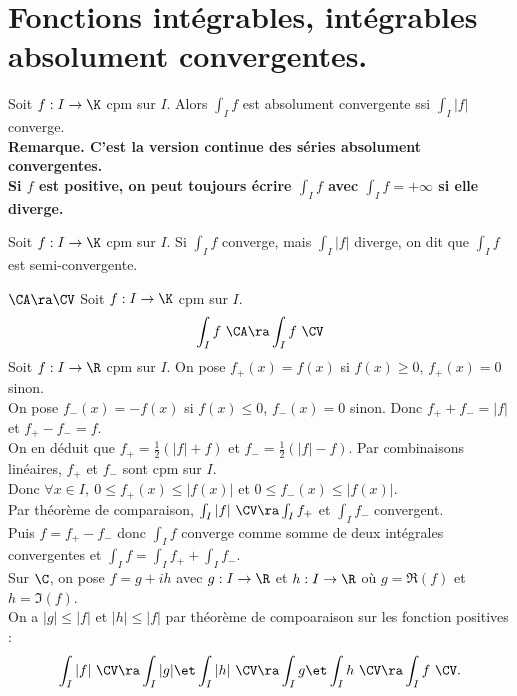 \documentclass[11pt]{article}
\begin{document}
\section{Fonctions intégrables, intégrables absolument convergentes.}

\begin{defi}{}{}
    Soit $f:I\to\K$ cpm sur $I$. Alors $\int_I f$ est absolument convergente ssi $\int_I|f|$ converge.\\
    \bf{Remarque.} C'est la version continue des séries absolument convergentes.\\
    Si $f$ est positive, on peut toujours écrire $\int_I f$ avec $\int_I f=+\infty$ si elle diverge.
\end{defi}

\begin{defi}{}{}
    Soit $f:I\to\K$ cpm sur $I$. Si $\int_I f$ converge, mais $\int_I|f|$ diverge, on dit que $\int_I f$ est semi-convergente.
\end{defi}

\begin{prop}{$\CA\ra\CV$}{}
    Soit $f:I\to\K$ cpm sur $I$.
    \begin{equation*}
        \int_I f ~ \CA \ra \int_I f ~ \CV
    \end{equation*}
    \tcblower
    Soit $f:I\to\R$ cpm sur $I$. On pose $f_+(x)=f(x)$ si $f(x)\geq0$, $f_+(x)=0$ sinon.\\
    On pose $f_-(x)=-f(x)$ si $f(x)\leq0$, $f_-(x)=0$ sinon. Donc $f_++f_-=|f|$ et $f_+-f_-=f$.\\
    On en déduit que $f_+=\frac{1}{2}(|f|+f)$ et $f_-=\frac{1}{2}(|f|-f)$. Par combinaisons linéaires, $f_+$ et $f_-$ sont cpm sur $I$.\\
    Donc $\forall x \in I, ~ 0\leq f_+(x) \leq |f(x)|$ et $0\leq f_-(x)\leq|f(x)|$.\\
    Par théorème de comparaison, $\int_I|f|~\CV\ra\int_If_+$ et $\int_If_-$ convergent.\\
    Puis $f=f_+-f_-$ donc $\int_I f$ converge comme somme de deux intégrales convergentes et $\int_If=\int_If_++\int_If_-$. \\
    Sur $\C$, on pose $f=g+ih$ avec $g:I\to\R$ et $h:I\to\R$ où $g=\Re(f)$ et $h=\Im(f)$.\\
    On a $|g|\leq|f|$ et $|h|\leq|f|$ par théorème de compoaraison sur les fonction positives :
    \begin{equation*}
        \int_I|f|~\CV\ra\int_I|g|\et\int_I|h|~\CV\ra\int_Ig\et\int_Ih~\CV\ra\int_If~\CV.
    \end{equation*}
\end{prop}
\end{document}
